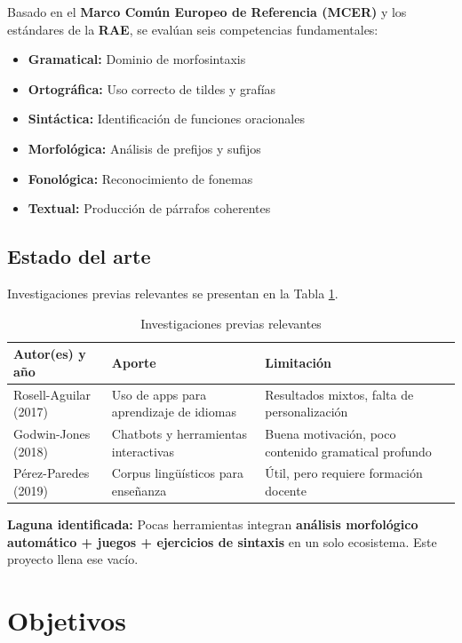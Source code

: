 \documentclass[12pt,spanish]{article}
\begin{document}
Basado en el \textbf{Marco Común Europeo de Referencia (MCER)} y los estándares de la \textbf{RAE}, se evalúan seis competencias fundamentales:

\begin{itemize}
    \item \textbf{Gramatical:} Dominio de morfosintaxis
    \item \textbf{Ortográfica:} Uso correcto de tildes y grafías
    \item \textbf{Sintáctica:} Identificación de funciones oracionales
    \item \textbf{Morfológica:} Análisis de prefijos y sufijos
    \item \textbf{Fonológica:} Reconocimiento de fonemas
    \item \textbf{Textual:} Producción de párrafos coherentes
\end{itemize}

\subsection{Estado del arte}

Investigaciones previas relevantes se presentan en la Tabla \ref{tab:estado_arte}.

\begin{table}[H]
\centering
\caption{Investigaciones previas relevantes}
\label{tab:estado_arte}
\begin{tabular}{|p{3.5cm}|p{6cm}|p{4cm}|}
\hline
\textbf{Autor(es) y año} & \textbf{Aporte} & \textbf{Limitación} \\
\hline
Rosell-Aguilar (2017) & Uso de apps para aprendizaje de idiomas & Resultados mixtos, falta de personalización \\
\hline
Godwin-Jones (2018) & Chatbots y herramientas interactivas & Buena motivación, poco contenido gramatical profundo \\
\hline
Pérez-Paredes (2019) & Corpus lingüísticos para enseñanza & Útil, pero requiere formación docente \\
\hline
\end{tabular}
\end{table}

\textbf{Laguna identificada:} Pocas herramientas integran \textbf{análisis morfológico automático + juegos + ejercicios de sintaxis} en un solo ecosistema. Este proyecto llena ese vacío.

\newpage
\section{Objetivos}
\end{document}
